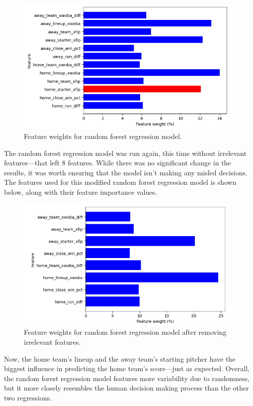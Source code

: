 \documentclass{paper}
\begin{document}
\begin{figure}[H]
  \centering
  \includegraphics[width=11cm]{fig10}
  \caption{Feature weights for random forest regression model.}
\end{figure}

The random forest regression model was run again, this time without irrelevant features---that left 8 features. While there was no significant change in the results, it was worth ensuring that the model isn't making any misled decisions. The features used for this modified random forest regression model is shown below, along with their feature importance values.

\begin{figure}[H]
  \centering
  \includegraphics[width=11cm]{fig11}
  \caption{Feature weights for random forest regression model after removing irrelevant features.}
\end{figure}

Now, the home team's lineup and the away team's starting pitcher have the biggest influence in predicting the home team's score---just as expected. Overall, the random forest regression model features more variability due to randomness, but it more closely resembles the human decision making process than the other two regressions.
\end{document}

